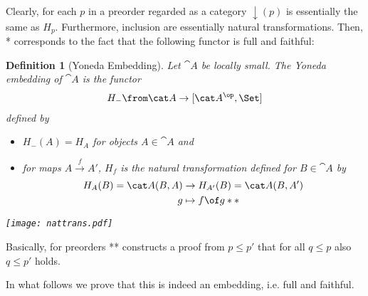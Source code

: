 \documentclass{article}
\newtheorem{definition}{Definition}
\begin{document}
Clearly, for each $p$ in a preorder regarded as a category $\downarrow(p)$ is essentially the same as $H_p$. Furthermore, inclusion are essentially natural transformations. Then, * corresponds to the fact that the following functor is full and faithful:

\begin{definition}[Yoneda Embedding]
  Let $\cat A$ be locally small. The \emph{Yoneda embedding} of $\cat A$ is the functor
  \begin{align*}
    H_-\from \cat A\to[\cat A^\op,\Set]
  \end{align*}
  defined by
  \begin{itemize}
  \item $H_-(A)=H_A$ for objects $A\in\cat A$ and
  \item for maps $A\xrightarrow{f}A'$, $H_f$ is the natural transformation defined for $B\in \cat A$ by
    \begin{align*}
      H_A(B)=\cat A(B,A)&\to H_{A'}(B)=\cat A(B,A')\\
      g&\mapsto  f\of g **\\
    \end{align*}
  \end{itemize}
  \vspace{-0.8cm}
  \texttt{[image: nattrans.pdf]}
\end{definition}
Basically, for preorders ** constructs a proof from $p\leq p'$ that for all $q\leq p$ also $q\leq p'$ holds.

In what follows we prove that this is indeed an embedding, i.e. full and faithful.
\end{document}
